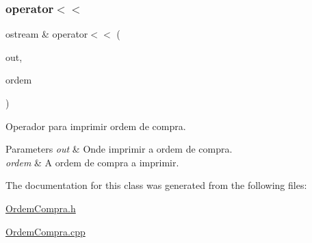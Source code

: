 \subsubsection{\texorpdfstring{operator$<$$<$}{operator<<}}
{\footnotesize\ttfamily ostream \& operator$<$$<$ (\begin{DoxyParamCaption}\item[{ostream \&}]{out,  }\item[{const \hyperlink{class_ordem_compra}{Ordem\+Compra} \&}]{ordem }\end{DoxyParamCaption})\hspace{0.3cm}{\ttfamily [friend]}}



Operador para imprimir ordem de compra. 


\begin{DoxyParams}{Parameters}
{\em out} & Onde imprimir a ordem de compra. \\
\hline
{\em ordem} & A ordem de compra a imprimir. \\
\hline
\end{DoxyParams}


The documentation for this class was generated from the following files\+:\begin{DoxyCompactItemize}
\item 
\hyperlink{_ordem_compra_8h}{Ordem\+Compra.\+h}\item 
\hyperlink{_ordem_compra_8cpp}{Ordem\+Compra.\+cpp}\end{DoxyCompactItemize}
